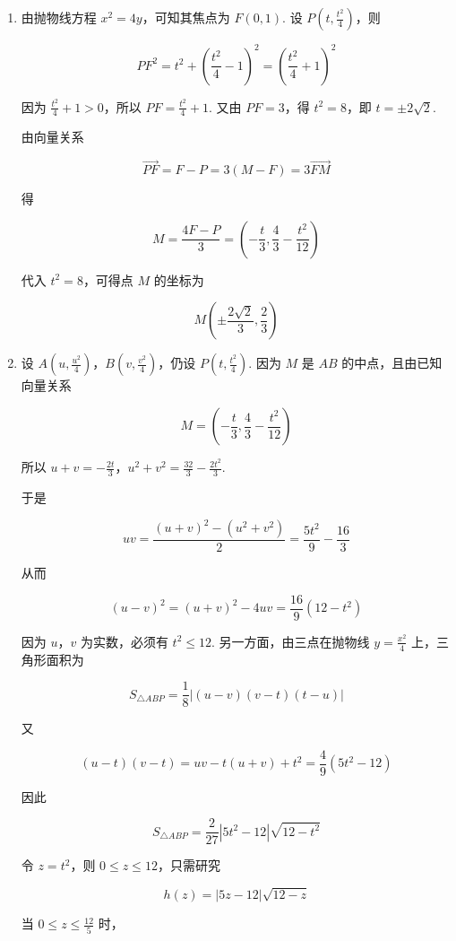 \begin{solution}
\begin{enumerate}
\item 由抛物线方程 \(x^2=4y\)，可知其焦点为 \(F(0,1)\). 设 \(P\left(t,\frac{t^2}{4}\right)\)，则

\[
PF^2=t^2+\left(\frac{t^2}{4}-1\right)^2=\left(\frac{t^2}{4}+1\right)^2
\]

因为 \(\frac{t^2}{4}+1>0\)，所以 \(PF=\frac{t^2}{4}+1\). 又由 \(PF=3\)，得 \(t^2=8\)，即 \(t=\pm2\sqrt{2}\).

由向量关系

\[
\overrightarrow{PF}=F-P=3(M-F)=3\overrightarrow{FM}
\]

得

\[
M=\frac{4F-P}{3}=\left(-\frac{t}{3},\frac{4}{3}-\frac{t^2}{12}\right)
\]

代入 \(t^2=8\)，可得点 \(M\) 的坐标为

\[
M\left(\pm\frac{2\sqrt{2}}{3},\frac{2}{3}\right)
\]

\item 设 \(A\left(u,\frac{u^2}{4}\right)\)，\(B\left(v,\frac{v^2}{4}\right)\)，仍设 \(P\left(t,\frac{t^2}{4}\right)\). 因为 \(M\) 是 \(AB\) 的中点，且由已知向量关系

\[
M=\left(-\frac{t}{3},\frac{4}{3}-\frac{t^2}{12}\right)
\]

所以 \(u+v=-\frac{2t}{3}\)，\(u^2+v^2=\frac{32}{3}-\frac{2t^2}{3}\).

于是

\[
uv=\frac{(u+v)^2-(u^2+v^2)}{2}=\frac{5t^2}{9}-\frac{16}{3}
\]

从而

\[
(u-v)^2=(u+v)^2-4uv=\frac{16}{9}(12-t^2)
\]

因为 \(u\)，\(v\) 为实数，必须有 \(t^2\leqslant12\). 另一方面，由三点在抛物线 \(y=\frac{x^2}{4}\) 上，三角形面积为

\[
S_{\triangle ABP}=\frac18\left|(u-v)(v-t)(t-u)\right|
\]

又

\[
(u-t)(v-t)=uv-t(u+v)+t^2=\frac{4}{9}(5t^2-12)
\]

因此

\[
S_{\triangle ABP}=\frac{2}{27}\left|5t^2-12\right|\sqrt{12-t^2}
\]

令 \(z=t^2\)，则 \(0\leqslant z\leqslant12\)，只需研究

\[
h(z)=\left|5z-12\right|\sqrt{12-z}
\]

当 \(0\leqslant z\leqslant\frac{12}{5}\) 时，


\end{enumerate}
\end{solution}
